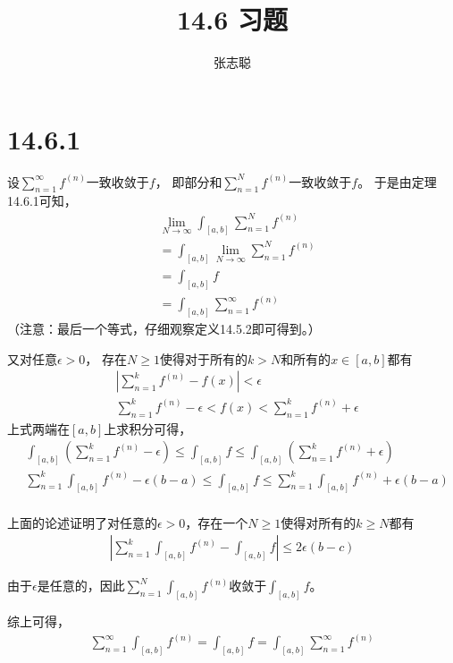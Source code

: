 \documentclass{article}
\begin{document}
\title{14.6 习题}
\author{张志聪}
\maketitle

\section*{14.6.1}

设$\sum\limits_{n=1}^{\infty} f^{(n)}$一致收敛于$f$，
即部分和$\sum\limits_{n=1}^{N} f^{(n)}$一致收敛于$f$。
于是由定理14.6.1可知，
\begin{align*}
   & \lim\limits_{N \to \infty} \int_{[a, b]} \sum\limits_{n=1}^{N} f^{(n)}   \\
   & = \int_{[a, b]} \lim\limits_{N \to \infty} \sum\limits_{n=1}^{N} f^{(n)} \\
   & = \int_{[a, b]} f                                                        \\
   & = \int_{[a, b]} \sum\limits_{n=1}^{\infty} f^{(n)}                       
\end{align*}
（注意：最后一个等式，仔细观察定义14.5.2即可得到。）

又对任意$\epsilon > 0$，
存在$N \geq 1$使得对于所有的$k > N$和所有的$x \in [a, b]$都有
\begin{align*}
   & |\sum\limits_{n=1}^{k} f^{(n)} - f(x)| < \epsilon                                         \\
   & \sum\limits_{n=1}^{k} f^{(n)} - \epsilon < f(x) < \sum\limits_{n=1}^{k} f^{(n)} +\epsilon
\end{align*}
上式两端在$[a, b]$上求积分可得，
\begin{align*}
   & \int_{[a, b]} (\sum\limits_{n=1}^{k} f^{(n)} - \epsilon) \leq \int_{[a, b]} f \leq \int_{[a, b]} (\sum\limits_{n=1}^{k} f^{(n)} + \epsilon)           \\
   & \sum\limits_{n=1}^{k} \int_{[a, b]} f^{(n)} - \epsilon(b - a) \leq \int_{[a, b]} f \leq \sum\limits_{n=1}^{k} \int_{[a, b]} f^{(n)} + \epsilon(b - a) \\
\end{align*}

上面的论述证明了对任意的$\epsilon > 0$，存在一个$N \geq 1$使得对所有的$k \geq N$都有
\begin{align*}
  \left|\sum\limits_{n=1}^{k} \int_{[a, b]} f^{(n)} - \int_{[a, b]} f \right| \leq 2\epsilon(b - c)
\end{align*}

由于$\epsilon$是任意的，因此$\sum\limits_{n=1}^{N} \int_{[a, b]} f^{(n)}$收敛于$\int_{[a, b]} f$。

综上可得，
\begin{align*}
  \sum\limits_{n=1}^{\infty} \int_{[a, b]} f^{(n)} = \int_{[a, b]} f = \int_{[a, b]} \sum\limits_{n=1}^{\infty} f^{(n)}
\end{align*}
\end{document}

